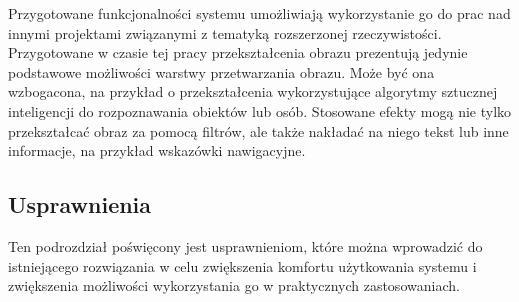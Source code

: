 \documentclass[a4paper,11pt,twoside]{report}
\theoremstyle{definition}
\begin{document}
Przygotowane funkcjonalności systemu umożliwiają wykorzystanie go do prac nad innymi projektami związanymi z tematyką rozszerzonej rzeczywistości. Przygotowane w czasie tej pracy przekształcenia obrazu prezentują jedynie podstawowe możliwości warstwy przetwarzania obrazu. Może być ona wzbogacona, na przykład o przekształcenia wykorzystujące algorytmy sztucznej inteligencji do rozpoznawania obiektów lub osób. Stosowane efekty mogą nie tylko przekształcać obraz za pomocą filtrów, ale także nakładać na niego tekst lub inne informacje, na przykład wskazówki nawigacyjne.

\subsection{Usprawnienia}

Ten podrozdział poświęcony jest usprawnieniom, które można wprowadzić do istniejącego rozwiązania w celu zwiększenia komfortu użytkowania systemu i zwiększenia możliwości wykorzystania go w praktycznych zastosowaniach.
\end{document}
